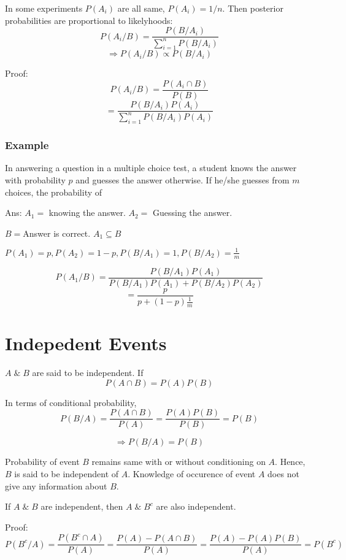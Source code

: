 \documentclass{article}
\begin{document}
In some experiments $P(A_i)$ are all same, $P(A_i)=1/n$. Then posterior probabilities are proportional to likelyhoods:
$$ P(A_i/B)= \frac{P(B/A_i)}{\sum_{i=1}^n P(B/A_i)}$$
$$ \Rightarrow P(A_i/B) \propto P(B/A_i)$$

Proof:
$$ P(A_i/B) = \frac{P(A_i \cap B)}{P(B)}$$
$$ = \frac{P(B/A_i)P(A_i)}{\sum_{i=1}^{n} P(B/A_i)P(A_i)}$$

\subsubsection{Example}
In answering a question in a multiple choice test, a student knows the answer with probability $p$ and guesses the answer otherwise. If he/she guesses from $m$ choices, the probability of

Ans: $A_1=$ knowing the answer. $A_2=$ Guessing the answer.

$B= $Answer is correct. $A_1 \subseteq B$

$P(A_1)= p, P(A_2)= 1-p, P(B/A_1)= 1, P(B/A_2)= \frac{1}{m}$

$$ P(A_1/B)= \frac{P(B/A_1)P(A_1)}{P(B/A_1)P(A_1)+ P(B/A_2)P(A_2)}$$
$$ = \frac{p}{p + (1-p)\frac{1}{m}}$$

\section{Indepedent Events}
$A \;\&\; B$ are said to be independent. If
$$ P(A \cap B) = P(A)P(B)$$

In terms of conditional probability,
$$ P(B/A)= \frac{P(A \cap B)}{P(A)} = \frac{P(A)P(B)}{P(B)} = P(B)$$

$$ \Rightarrow P(B/A) = P(B)$$

Probability of event $B$ remains same with or without conditioning on $A$. Hence, $B$ is said to be independent of $A$.
Knowledge of occurence of event $A$ does not give any information about $B$.

If $A\; \&\; B $ are independent, then
$ A \;\&\; B^c$ are also independent.

Proof:
$$ P(B^c / A)= \frac{P(B^c \cap A)}{P(A)}= \frac{P(A)- P(A \cap B)}{P(A)}= \frac{P(A)- P(A)P(B)}{P(A)} = P(B^c)$$
\end{document}
